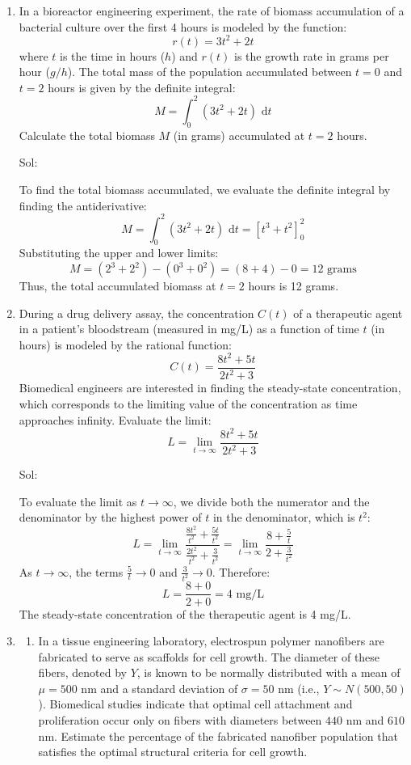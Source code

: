\documentclass[11pt,svgnames,spanish,oneside]{amsart}
\newenvironment{mysolution}{%
  \bigskip

  \solution\color{blue}Sol:
}{%
  \endsolution
}
\newcommand{\dd}{\, \text{d}}
\begin{document}
\begin{enumerate}[label=\textbf{P\arabic*.},itemsep=1em,leftmargin=*]
  \item In a bioreactor engineering experiment, the rate of biomass accumulation of a bacterial culture over the first 4 hours is modeled by the function:
  $$ r(t) = 3t^2 + 2t $$
  where $t$ is the time in hours ($h$) and $r(t)$ is the growth rate in grams per hour ($g/h$).
  The total mass of the population accumulated between $t = 0$ and $t = 2$ hours is given by the definite integral:
  $$ M= \int_{0}^{2} (3t^2 + 2t) \,\dd t $$
  Calculate the total biomass $M$ (in grams) accumulated at $t = 2$ hours.

  \begin{mysolution}
  To find the total biomass accumulated, we evaluate the definite integral by finding the antiderivative:
  $$ M = \int_{0}^{2} (3t^2 + 2t) \,\dd t = \left[ t^3 + t^2 \right]_{0}^{2} $$
  Substituting the upper and lower limits:
  $$ M = (2^3 + 2^2) - (0^3 + 0^2) = (8 + 4) - 0 = 12 \text{ grams} $$
  Thus, the total accumulated biomass at $t = 2$ hours is 12 grams.
  \end{mysolution}


  \medskip
  \item During a drug delivery assay, the concentration $C(t)$ of a therapeutic agent in a patient's bloodstream (measured in mg/L) as a function of time $t$ (in hours) is modeled by the rational function:
  $$ C(t) = \frac{8t^2 + 5t}{2t^2 + 3} $$
  Biomedical engineers are interested in finding the steady-state concentration, which corresponds to the limiting value of the concentration as time approaches infinity.
    Evaluate the limit:
    $$ L = \lim_{t \to \infty} \frac{8t^2 + 5t}{2t^2 + 3} $$

  \begin{mysolution}
  To evaluate the limit as $t \to \infty$, we divide both the numerator and the denominator by the highest power of $t$ in the denominator, which is $t^2$:
  $$ L = \lim_{t \to \infty} \frac{\frac{8t^2}{t^2} + \frac{5t}{t^2}}{\frac{2t^2}{t^2} + \frac{3}{t^2}} = \lim_{t \to \infty} \frac{8 + \frac{5}{t}}{2 + \frac{3}{t^2}} $$
  As $t \to \infty$, the terms $\frac{5}{t} \to 0$ and $\frac{3}{t^2} \to 0$. Therefore:
  $$ L = \frac{8 + 0}{2 + 0} = 4 \text{ mg/L} $$
  The steady-state concentration of the therapeutic agent is 4 mg/L.
  \end{mysolution}

  \medskip
  \item
  \begin{enumerate}
    \item In a tissue engineering laboratory, electrospun polymer nanofibers are fabricated to serve as scaffolds for cell growth. The diameter of these fibers, denoted by $Y$, is known to be normally distributed with a mean of $\mu = 500$ nm and a standard deviation of $\sigma = 50$ nm (i.e., $Y \sim N(500, 50)$).
    Biomedical studies indicate that optimal cell attachment and proliferation occur only on fibers with diameters between $440$ nm and $610$ nm. Estimate the percentage of the fabricated nanofiber population that satisfies the optimal structural criteria for cell growth.


\end{enumerate}
\end{enumerate}
\end{document}
